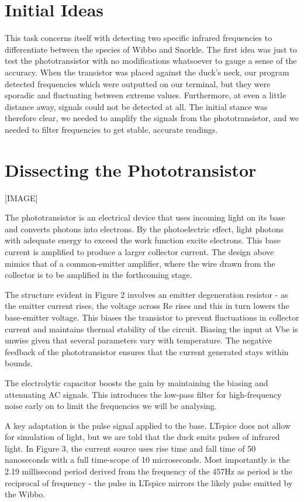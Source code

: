 \section{Initial Ideas}
This task concerns itself with detecting two specific infrared frequencies to differentiate between the species of Wibbo and Snorkle. The first idea was just to test the phototransistor with no modifications whatsoever to gauge a sense of the accuracy. When the transistor was placed against the duck’s neck, our program detected frequencies which were outputted on our terminal, but they were sporadic and fluctuating between extreme values. Furthermore, at even a little distance away, signals could not be detected at all. The initial stance was therefore clear, we needed to amplify the signals from the phototransistor, and we needed to filter frequencies to get stable, accurate readings.

\section{Dissecting the Phototransistor}
 [IMAGE]

The phototransistor is an electrical device that uses incoming light on its base and converts photons into electrons. By the photoelectric effect, light photons with adequate energy to exceed the work function excite electrons. This base current is amplified to produce a larger collector current. The design above mimics that of a common-emitter amplifier, where the wire drawn from the collector is to be amplified in the forthcoming stage.

The structure evident in Figure 2 involves an emitter degeneration resistor - as the emitter current rises, the voltage across Re rises and this in turn lowers the base-emitter voltage. This biases the transistor to prevent fluctuations in collector current and maintains thermal stability of the circuit. Biasing the input at Vbe is unwise given that several parameters vary with temperature. The negative feedback of the phototransistor ensures that the current generated stays within bounds.

The electrolytic capacitor boosts the gain by maintaining the biasing and attenuating AC signals. This introduces the low-pass filter for high-frequency noise early on to limit the frequencies we will be analysing.

A key adaptation is the pulse signal applied to the base. LTspice does not allow for simulation of light, but we are told that the duck emits pulses of infrared light. In Figure 3, the current source uses rise time and fall time of 50 nanoseconds with a full time-scope of 10 microseconds. Most importantly is the 2.19 millisecond period derived from the frequency of the 457Hz as period is the reciprocal of frequency - the pulse in LTspice mirrors the likely pulse emitted by the Wibbo.

